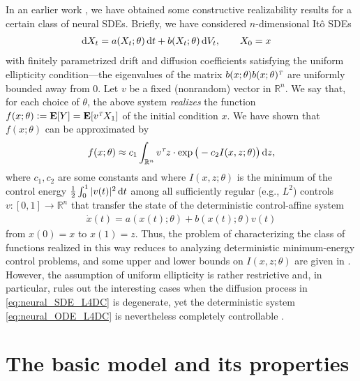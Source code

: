 \documentclass[letterpaper, 10pt, conference]{ieeeconf}
\def\Reals{{\mathbb R}}
\def\Ex{{\mathbf E}} %
\def\trn{{\hbox{\it\tiny T}}} %
\def\deq{:=}
\begin{document}
In an earlier work \cite{Veeravalli_L4DC2023}, we have obtained some constructive realizability results for a certain class of neural SDEs. Briefly, we have considered $n$-dimensional It\^o SDEs 
\begin{align}\label{eq:neural_SDE_L4DC}
	\dif X_t &= a(X_t; \theta) \dif t + b(X_t; \theta) \dif V_t, \qquad X_0 = x 
\end{align}
with finitely parametrized drift and diffusion coefficients satisfying the uniform ellipticity condition---the eigenvalues of the matrix $b(x;\theta)b(x;\theta)^\trn$ are uniformly bounded away from $0$.  Let $v$ be a fixed (nonrandom) vector in $\Reals^n$. We say that, for each choice of $\theta$, the above system \textit{realizes} the function $f(x;\theta) \deq \Ex[Y] = \Ex[v^\trn X_1]$ of the initial condition $x$. We have shown that $f(x;\theta)$ can be approximated by
\begin{align*}%
	f(x;\theta) \approx c_1\int_{\Reals^n}  v^\trn z \cdot \exp\big(-c_2 I(x,z;\theta)\big) \dif z,
\end{align*}
where $c_1,c_2$ are some constants and where $I(x,z; \theta)$ is the minimum of the control energy $\frac{1}{2}\int^1_0 |v(t)|^2 \dif t$ among all sufficiently regular (e.g., $L^2$) controls $v : [0,1] \to \Reals^n$ that transfer the state of the deterministic control-affine system
\begin{align}\label{eq:neural_ODE_L4DC}
	\dot{x}(t) = a(x(t);\theta) + b(x(t);\theta)v(t)
\end{align}
from $x(0) = x$ to $x(1) = z$. Thus, the problem of characterizing the class of functions realized in this way reduces to analyzing deterministic minimum-energy control problems, and some upper and lower bounds on $I(x,z;\theta)$ are given in \cite{Veeravalli_L4DC2023}. However, the assumption of uniform ellipticity is rather restrictive and, in particular, rules out the interesting cases when the diffusion process in \eqref{eq:neural_SDE_L4DC} is degenerate, yet the deterministic system \eqref{eq:neural_ODE_L4DC} is nevertheless completely controllable \cite{Elliott_diffusions,Brockett_spheres}.

\section{The basic model and its properties}
\end{document}
